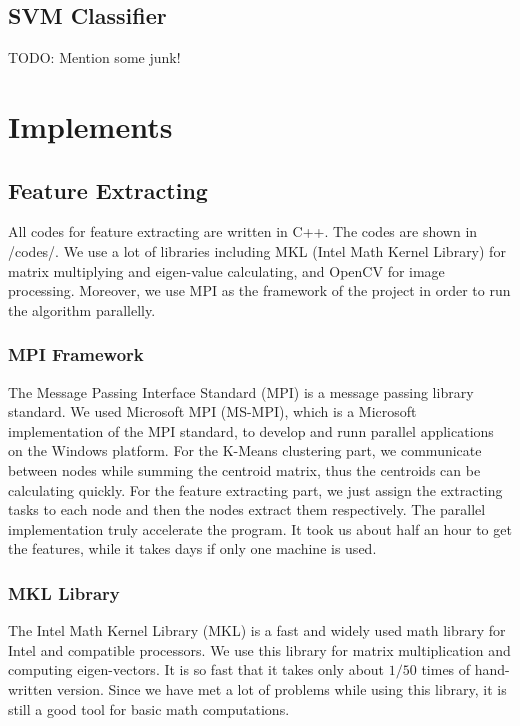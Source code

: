 \documentclass[12pt,abstract=true]{scrartcl}
\numberwithin{equation}{section}
\theoremstyle{definition}   \newtheorem{definition}{Definition}[section]
\theoremstyle{plain}        \newtheorem{theorem}{Theorem}[section]
\theoremstyle{plain}        \newtheorem{observation}{Observation}[section]
\theoremstyle{plain}        \newtheorem{fact}{Fact}[section]
\theoremstyle{plain}        \newtheorem{claim}{Claim}[section]
\theoremstyle{plain}        \newtheorem{lemma}[theorem]{Lemma}
\theoremstyle{plain}        \newtheorem{corollary}[theorem]{Corollary}
\theoremstyle{remark}       \newtheorem{example}{Example}[section]
\theoremstyle{remark}       \newtheorem{remark}{Remark}[section]
\begin{document}
	\subsection{SVM Classifier}
		{\color{red}TODO: Mention some junk!}

\section{Implements}

	\subsection{Feature Extracting}
		All codes for feature extracting are written in C++.
		The codes are shown in /codes/.
		We use a lot of libraries including MKL (Intel Math Kernel Library)
			for matrix multiplying and eigen-value calculating,
			and OpenCV for image processing.
		Moreover, we use MPI as the framework of the project
			in order to run the algorithm parallelly.
		
		\subsubsection{MPI Framework}
			The Message Passing Interface Standard (MPI) is a message passing library standard.
			We used Microsoft MPI (MS-MPI),
				which is a Microsoft implementation of the MPI standard,
				to develop and runn parallel applications on the Windows platform.
			For the K-Means clustering part,
				we communicate between nodes while summing the centroid matrix,
				thus the centroids can be calculating quickly.
			For the feature extracting part,
				we just assign the extracting tasks to each node
				and then the nodes extract them respectively.
			The parallel implementation truly accelerate the program.
			It took us about half an hour to get the features,
				while it takes days if only one machine is used.
		
		\subsubsection{MKL Library}
			The Intel Math Kernel Library (MKL) is a
				fast and widely used math library for Intel and compatible processors.
			We use this library for matrix multiplication and computing eigen-vectors.
			It is so fast that it takes only about $1/50$ times of hand-written version.
			Since we have met a lot of problems	while using this library,
				it is still a good tool for basic math computations.
				
\end{document}
